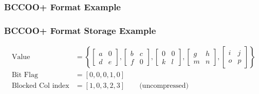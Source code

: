 \begin{frame}
	\frametitle{BCCOO+ Format Example}
	
\end{frame}

\begin{frame}
	\frametitle{BCCOO+ Format Storage Example}
	\begin{align*}
		\text{Value} &= \left \{ \begin{bmatrix}
		a & 0\\ 
		d & e
		\end{bmatrix}, 
		\begin{bmatrix}
		b & c\\ 
		f & 0
		\end{bmatrix}, 
		\begin{bmatrix}
		0 & 0\\ 
		k & l
		\end{bmatrix}, 
		\begin{bmatrix}
		g & h\\ 
		m & n
		\end{bmatrix}, 
		\begin{bmatrix}
		i & j\\ 
		o & p
		\end{bmatrix}
		\right \} \\
		\text{Bit Flag}			 &= [0, 0, 0, 1, 0]	\\
		\text{Blocked Col index} &= [1, 0, 3, 2, 3] \qquad \text{(uncompressed)}\\
	\end{align*}
\end{frame}
